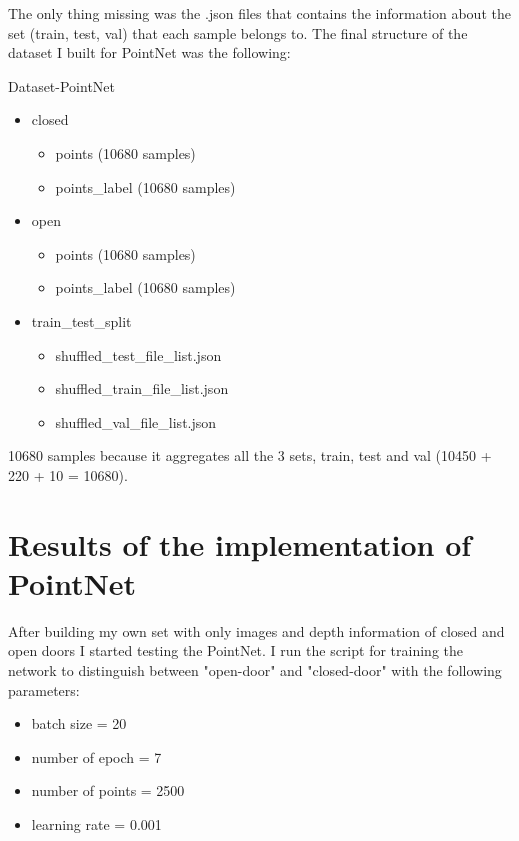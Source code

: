     The only thing missing was the .json files that contains the information about the set (train, test, val) that each sample belongs to. The final structure of the dataset I built for PointNet was the following:
    
    \bigskip
    
    Dataset-PointNet
    \begin{itemize}
        \item closed
        \begin{itemize}
            \item points        (10680 samples)
            \item points\_label  (10680 samples)
        \end{itemize}
        \item open
        \begin{itemize}
            \item points        (10680 samples)
            \item points\_label  (10680 samples)
        \end{itemize}
        \item train\_test\_split
        \begin{itemize}
            \item shuffled\_test\_file\_list.json
            \item shuffled\_train\_file\_list.json
            \item shuffled\_val\_file\_list.json
        \end{itemize}
    \end{itemize}
    
    10680 samples because it aggregates all the 3 sets, train, test and val (10450 + 220 + 10 = 10680).
    
\section{Results of the implementation of PointNet}
    
    After building my own set with only images and depth information of closed and open doors I started testing the PointNet. I run the script for training the network to distinguish between "open-door" and "closed-door" with the following parameters:
    
    \begin{itemize}
        \item batch size = 20
        \item number of epoch = 7
        \item number of points = 2500
        \item learning rate = 0.001
    \end{itemize}
    
